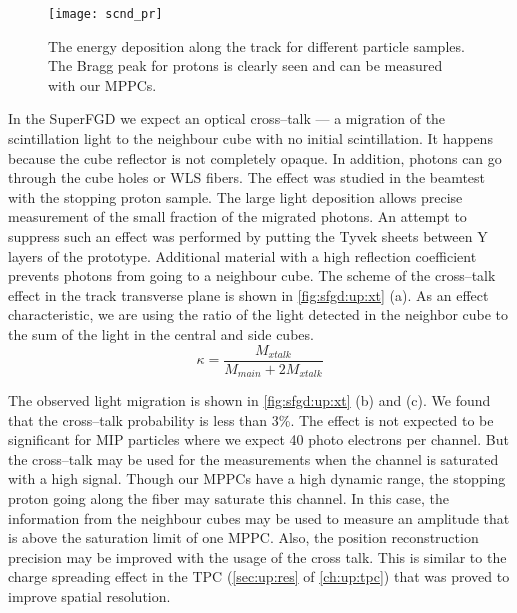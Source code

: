 \documentclass[main.tex]{subfiles}
\begin{document}
\begin{figure}[!ht]
	\centering
	\texttt{[image: scnd\_pr]}
	\caption{The energy deposition along the track for different particle samples. The Bragg peak for protons is clearly seen and can be measured with our MPPCs.}
	\label{fig:up:sfgd:scnd_pr}
\end{figure}

In the SuperFGD we expect an optical cross--talk --- a migration of the scintillation light to the neighbour cube with no initial scintillation. It happens because the cube reflector is not completely opaque. In addition, photons can go through the cube holes or WLS fibers. The effect was studied in the beamtest with the stopping proton sample. The large light deposition allows precise measurement of the small fraction of the migrated photons. An attempt to suppress such an effect was performed by putting the Tyvek sheets between Y layers of the prototype. Additional material with a high reflection coefficient prevents photons from going to a neighbour cube. The scheme of the cross--talk effect in the track transverse plane is shown in \autoref{fig:sfgd:up:xt} (a). As an effect characteristic, we are using the ratio of the light detected in the neighbor cube to the sum of the light in the central and side cubes.
\begin{equation}
\label{eq:xt}
\kappa=\frac{M_{xtalk}}{M_{main}+2M_{xtalk}}
\end{equation}

The observed light migration is shown in \autoref{fig:sfgd:up:xt} (b) and (c). We found that the cross--talk probability is less than 3\%. The effect is not expected to be significant for MIP particles where we expect 40 photo electrons per channel. But the cross--talk may be used for the measurements when the channel is saturated with a high signal. Though our MPPCs have a high dynamic range, the stopping proton going along the fiber may saturate this channel. In this case, the information from the neighbour cubes may be used to measure an amplitude that is above the saturation limit of one MPPC. Also, the position reconstruction precision may be improved with the usage of the cross talk. This is similar to the charge spreading effect in the TPC (\autoref{sec:up:res} of \autoref{ch:up:tpc}) that was proved to improve spatial resolution.
\end{document}

